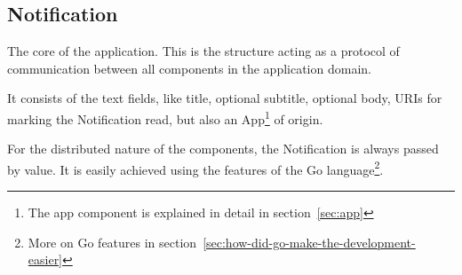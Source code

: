 \subsection{Notification}\label{sec:notification}

The core of the application.
This is the structure
acting as a protocol of communication
between all components in the application domain.

It consists of the text fields,
like title, optional subtitle, optional body,
URIs for marking the Notification read,
but also an App\footnote{
  The app component is explained in detail in section~\ref{sec:app}
} of origin.

For the distributed nature of the components,
the Notification is always passed by value.
It is easily achieved
using the features of
the Go language\footnote{
  More on Go features in section~\ref{sec:how-did-go-make-the-development-easier}
}.
